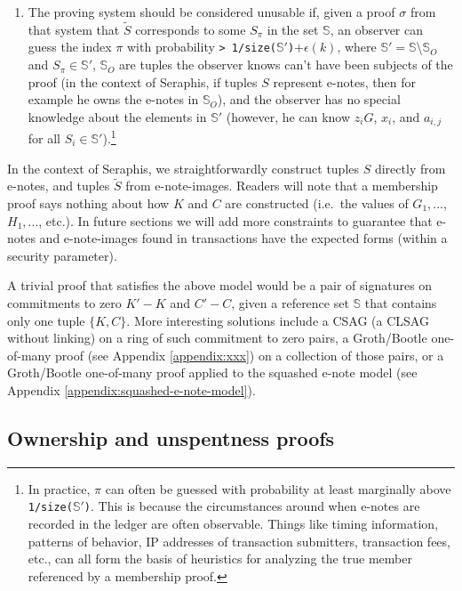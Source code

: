 \begin{enumerate}
    \item The proving system should be considered unusable if, given a proof $\sigma$ from that system that $\tilde{S}$ corresponds to some $S_{\pi}$ in the set $\mathbb{S}$, an observer can guess the index $\pi$ with probability {\tt > 1/size(}$\mathbb{S}'${\tt )}$+ \epsilon(k)$, where $\mathbb{S}' = \mathbb{S}$\textbackslash$\mathbb{S}_O$ and $S_{\pi} \in \mathbb{S}'$, $\mathbb{S}_O$ are tuples the observer knows can't have been subjects of the proof (in the context of Seraphis, if tuples $S$ represent e-notes, then for example he owns the e-notes in $\mathbb{S}_O$), and the observer has no special knowledge about the elements in $\mathbb{S}'$ (however, he can know $z_i G$, $x_i$, and $a_{i,j}$ for all $S_i \in \mathbb{S}'$).\footnote{In practice, $\pi$ can often be guessed with probability at least marginally above {\tt 1/size(}$\mathbb{S}'${\tt )}. This is because the circumstances around when e-notes are recorded in the ledger are often observable. Things like timing information, patterns of behavior, IP addresses of transaction submitters, transaction fees, etc., can all form the basis of heuristics for analyzing the true member referenced by a membership proof.}
\end{enumerate}

In the context of Seraphis, we straightforwardly construct tuples $S$ directly from e-notes, and tuples $\tilde{S}$ from e-note-images. Readers will note that a membership proof says nothing about how $K$ and $C$ are constructed (i.e.\ the values of $G_1,...$, $H_1,...$, etc.). In future sections we will add more constraints to guarantee that e-notes and e-note-images found in transactions have the expected forms (within a security parameter).

A trivial proof that satisfies the above model would be a pair of signatures on commitments to zero $K' - K$ and $C' - C$, given a reference set $\mathbb{S}$ that contains only one tuple $\{K, C\}$. More interesting solutions include a CSAG (a CLSAG \cite{clsag-eprint} without linking) on a ring of such commitment to zero pairs, a Groth/Bootle \cite{...} one-of-many proof (see Appendix \ref{appendix:xxx}) on a collection of those pairs, or a Groth/Bootle one-of-many proof applied to the squashed e-note model (see Appendix \ref{appendix:squashed-e-note-model}).


\subsection{Ownership and unspentness proofs}
\label{subsec:seraphis-ownership-unspentness-proofs}


